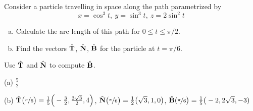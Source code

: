 \begin{question}[M317 2001A] %
Consider a particle travelling in space along the 
path parametrized by  
\begin{equation*}
x=\cos^3t,\ y=\sin ^3t,\ z=2\sin^2 t
\end{equation*}
\begin{enumerate}[(a)]
\item
Calculate the arc length of this path for $0\le t\le \pi/2$.

\item
Find the vectors $\hat{\mathbf{T}}$, $\hat{\mathbf{N}}$, $\hat{\mathbf{B}}$ for 
the particle at $t=\pi/6$.
\end{enumerate}
\end{question}

\begin{hint} 
Use $\hat{\mathbf{T}}$ and $\hat{\mathbf{N}}$ to compute $\hat{\mathbf{B}}$.
\end{hint}

\begin{answer} 
(a) $\frac{5}{2}$

(b) $\hat{\mathbf{T}}\big(\nicefrac{\pi}{6}\big)
           =\frac{1}{5}\Big(-\frac{3}{2},\frac{3\sqrt{3}}{2}, 4\Big)$,   
    $\hat{\mathbf{N}}\big(\nicefrac{\pi}{6}\big) 
               =\frac{1}{2}\big(\sqrt{3},1,0\big)$, 
    $\hat{\mathbf{B}}(\nicefrac{\pi}{6}\big)
          =\frac{1}{5}\big(-2,2\sqrt{3},-3)$ 
\end{answer}


